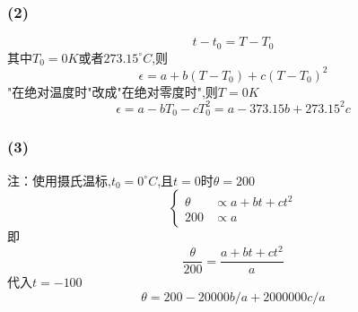 \documentclass{article}
\begin{document}
\subsubsection*{(2)}
\begin{equation}
	t-t_0 = T-T_0
\end{equation}
其中$T_0=0K$或者$273.15 ^{\circ}C$,则
\begin{equation}
	\epsilon = a+b(T-T_0)+c(T-T_0)^2
\end{equation}
"在绝对温度时"改成"在绝对零度时",则$T=0K$
\begin{equation}
\epsilon = a-b T_0 -cT_0^2 = a - 373.15 b +  273.15^2 c
\end{equation}
\subsubsection*{(3)}
注：使用摄氏温标,$t_0=0^{\circ}C$,且$t=0$时$\theta=200$
\begin{equation}
\left\{\begin{aligned}
\theta &\propto a+bt+ct^2 \\
200    &\propto a
\end{aligned}\right.
\end{equation}即
\begin{equation}
\frac{\theta}{200}=\frac{a+bt+ct^2}{a}
\end{equation}
代入$t=-100$
\begin{equation}
\theta = 200 - 20000b/a + 2000000 c/a
\end{equation}
\end{document}
